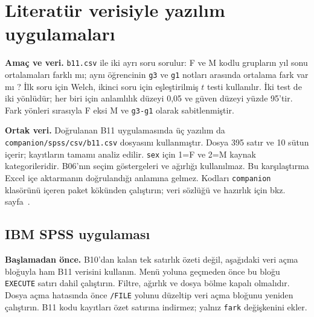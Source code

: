 \section{Literatür verisiyle yazılım uygulamaları}
\label{sec:spss-b11}

\textbf{Amaç ve veri.} \texttt{b11.csv} ile iki ayrı soru sorulur:
F ve M kodlu grupların yıl sonu ortalamaları farklı mı; aynı öğrencinin
\texttt{g3} ve \texttt{g1} notları arasında ortalama fark var mı
\citep{cortez2008data}?
İlk soru için Welch, ikinci soru için eşleştirilmiş $t$ testi kullanılır.
İki test de iki yönlüdür; her biri için anlamlılık düzeyi 0,05 ve
güven düzeyi yüzde 95'tir. Fark yönleri sırasıyla F eksi M ve
\texttt{g3-g1} olarak sabitlenmiştir.

\textbf{Ortak veri.} Doğrulanan B11 uygulamasında üç yazılım da
\nolinkurl{companion/spss/csv/b11.csv} dosyasını kullanmıştır.
Dosya 395 satır ve 10 sütun içerir; kayıtların tamamı analiz edilir.
\texttt{sex} için 1=F ve 2=M kaynak kategorileridir. B06'nın seçim
göstergeleri ve ağırlığı kullanılmaz. Bu karşılaştırma Excel içe
aktarmanın doğrulandığı anlamına gelmez. Kodları \texttt{companion}
klasörünü içeren paket kökünden çalıştırın; veri sözlüğü ve hazırlık
için bkz. sayfa~\pageref{sec:spss-guide}.

\subsection{IBM SPSS uygulaması}
\textbf{Başlamadan önce.} B10'dan kalan tek satırlık özeti değil,
aşağıdaki veri açma bloğuyla ham B11 verisini kullanın. Menü yoluna
geçmeden önce bu bloğu \texttt{EXECUTE} satırı dahil çalıştırın.
Filtre, ağırlık ve dosya bölme kapalı olmalıdır. Dosya açma hatasında
önce \texttt{/FILE} yolunu düzeltip veri açma bloğunu yeniden çalıştırın.
B11 kodu kayıtları özet satırına indirmez; yalnız \texttt{fark}
değişkenini ekler.

